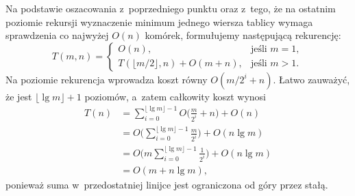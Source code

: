 \subproblem %
Na podstawie oszacowania z~poprzedniego punktu oraz z~tego, że na ostatnim poziomie rekursji wyznaczenie minimum jednego wiersza tablicy wymaga sprawdzenia co najwyżej $O(n)$ komórek, formułujemy następującą rekurencję:
\[
	T(m,n) =
	\begin{cases}
		O(n), & \text{jeśli $m=1$}, \\
		T(\lfloor m/2\rfloor,n)+O(m+n), & \text{jeśli $m>1$}.
	\end{cases}
\]
Na  poziomie rekurencja wprowadza koszt równy $O(m/2^i+n)$. Łatwo zauważyć, że jest $\lfloor\lg m\rfloor+1$ poziomów, a~zatem całkowity koszt wynosi
\begin{align*}
	T(n) &= \sum_{i=0}^{\lfloor\lg m\rfloor-1}O\biggl(\frac{m}{2^i}+n\biggr)+O(n) \\
	&= O\biggl(\sum_{i=0}^{\lfloor\lg m\rfloor-1}\frac{m}{2^i}\biggr)+O(n\lg m) \\
	&= O\biggl(m\sum_{i=0}^{\lfloor\lg m\rfloor-1}\frac{1}{2^i}\biggr)+O(n\lg m) \\
	&= O(m+n\lg m),
\end{align*}
ponieważ suma w~przedostatniej linijce jest ograniczona od góry przez stałą.

\endinput
